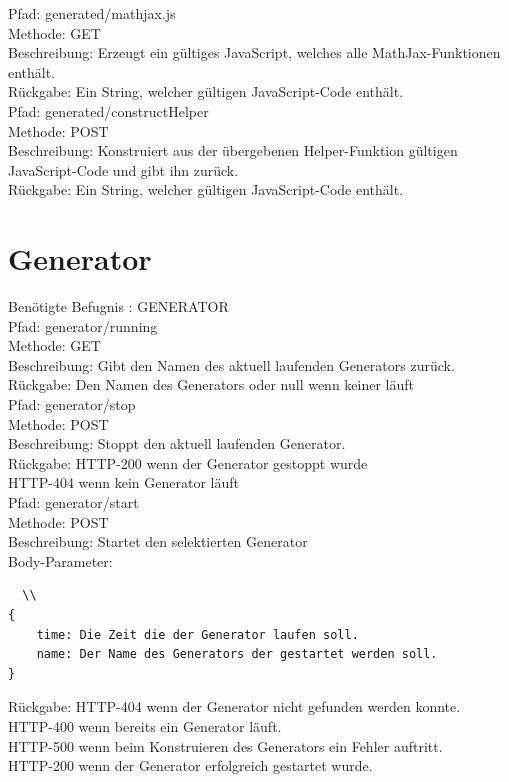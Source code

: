 \noindent Pfad: generated/mathjax.js\\
Methode: GET \\
Beschreibung: Erzeugt ein gültiges JavaScript, welches alle MathJax-Funktionen enthält. \\
Rückgabe: Ein String, welcher gültigen JavaScript-Code enthält. \\

\noindent Pfad: generated/constructHelper\\
Methode: POST \\
Beschreibung: Konstruiert aus der übergebenen Helper-Funktion gültigen JavaScript-Code und gibt ihn zurück.  \\
Rückgabe: Ein String, welcher gültigen JavaScript-Code enthält. \\


\section{Generator}

Benötigte Befugnis : GENERATOR \\

\noindent Pfad: generator/running \\
Methode: GET \\
Beschreibung: Gibt den Namen des aktuell laufenden Generators zurück.  \\
Rückgabe: Den Namen des Generators oder null wenn keiner läuft \\

\noindent Pfad: generator/stop \\
Methode: POST \\
Beschreibung: Stoppt den aktuell laufenden Generator.  \\
Rückgabe: HTTP-200 wenn der Generator gestoppt wurde\\
HTTP-404 wenn kein Generator läuft\\

\noindent Pfad: generator/start \\
Methode: POST \\
Beschreibung: Startet den selektierten Generator  \\
Body-Parameter:
\begin{lstlisting}  \\
{
	time: Die Zeit die der Generator laufen soll.
	name: Der Name des Generators der gestartet werden soll.
}
\end{lstlisting}
Rückgabe: HTTP-404 wenn der Generator nicht gefunden werden konnte. \\
HTTP-400 wenn bereits ein Generator läuft. \\
HTTP-500 wenn beim Konstruieren des Generators ein Fehler auftritt.\\
HTTP-200 wenn der Generator erfolgreich gestartet wurde.

